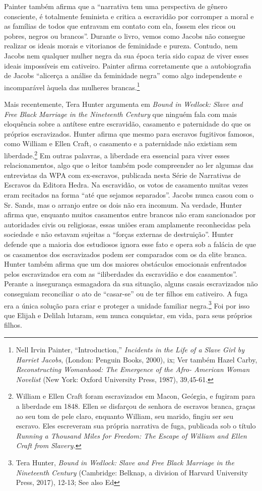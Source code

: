 Painter também afirma que a ``narrativa tem uma perspectiva de gênero
consciente, é totalmente feminista e critica a escravidão por corromper
a moral e as famílias de todos que entravam em contato com ela, fossem
eles ricos ou pobres, negros ou brancos''. Durante o livro, vemos como
Jacobs não consegue realizar os ideais morais e vitorianos de feminidade
e pureza. Contudo, nem Jacobs nem qualquer mulher negra da sua época
teria sido capaz de viver esses ideais impossíveis em cativeiro. Painter
afirma corretamente que a autobiografia de Jacobs ``alicerça a análise
da feminidade negra'' como algo independente e incomparável àquela das
mulheres brancas.\footnote{Nell Irvin Painter, ``Introduction,''
  \emph{Incidents in the Life of a Slave Girl by Harriet Jacobs},
  (London: Penguin Books, 2000), ix; Ver também Hazel Carby,
  \emph{Reconstructing Womanhood: The Emergence of the Afro- American
  Woman Novelist} (New York: Oxford University Press, 1987), 39,45-61.}

Mais recentemente, Tera Hunter argumenta em \emph{Bound in Wedlock:
Slave and Free Black Marriage in the Nineteenth Century} que ninguém
fala com mais eloquência sobre a antítese entre escravidão, casamento e
paternidade do que os próprios escravizados. Hunter afirma que mesmo
para escravos fugitivos famosos, como William e Ellen Craft, o casamento
e a paternidade não existiam sem liberdade.\footnote{
  William e Ellen Craft foram escravizados em Macon, Geórgia, e fugiram
  para a liberdade em 1848. Ellen se disfarçou de senhora de escravos
  branca, graças ao seu tom de pele claro, enquanto William, seu marido,
  fingiu ser seu escravo. Eles escreveram sua própria narrativa de fuga,
  publicada sob o título \emph{Running a Thousand Miles for Freedom: The
  Escape of William and Ellen Craft from Slavery.}} Em outras palavras,
a liberdade era essencial para viver esses relacionamentos, algo que o
leitor também pode compreender ao ler algumas das entrevistas da WPA com
ex-escravos, publicada nesta Série de Narrativas de Escravos da Editora
Hedra. Na escravidão, os votos de casamento muitas vezes eram recitados
na forma ``até que sejamos separados''. Jacobs nunca casou com o Sr.
Sands, mas o arranjo entre os dois não era incomum. Na verdade, Hunter
afirma que, enquanto muitos casamentos entre brancos não eram
sancionados por autoridades civis ou religiosas, essas uniões eram
amplamente reconhecidas pela sociedade e não estavam sujeitas a ``forças
externas de destruição''. Hunter defende que a maioria dos estudiosos
ignora esse fato e opera sob a falácia de que os casamentos dos
escravizados podem ser comparados com os da elite branca. Hunter também
afirma que um dos maiores obstáculos emocionais enfrentados pelos
escravizados era com as ``iliberdades da escravidão e dos casamentos''.
Perante a insegurança esmagadora da sua situação, alguns casais
escravizados não conseguiam reconciliar o ato de ``casar-se'' ou de ter
filhos em cativeiro. A fuga era a única solução para criar e proteger a
unidade familiar negra.\footnote{Tera Hunter, \emph{Bound in Wedlock:
  Slave and Free Black Marriage in the Nineteenth Century} (Cambridge:
  Belknap, a division of Harvard University Press, 2017), 12-13; See
  also Ed} Foi por isso que Elijah e Delilah lutaram, sem nunca
conquistar, em vida, para seus próprios filhos.

